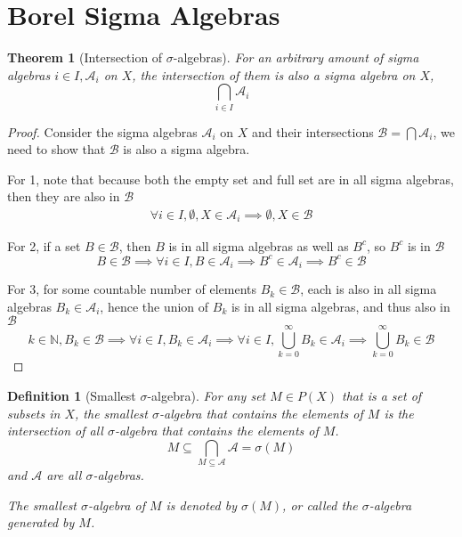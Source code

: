 \documentclass{article}
\newtheorem{theorem}{Theorem}[section]
\newtheorem{defi}{Definition}[section]
\begin{document}
\section{Borel Sigma Algebras}
\begin{theorem}[Intersection of $\sigma$-algebras]
    For an arbitrary amount of sigma algebras $i \in I, \mathcal A_i$ on $X$, the intersection of them is also a sigma algebra on $X$,
    \[
        \bigcap_{i \in I} \mathcal A_i
    \]
\end{theorem}
\begin{proof}
    Consider the sigma algebras $\mathcal A_i$ on $X$ and their intersections $\mathcal B = \bigcap \mathcal A_i$, we need to show that $\mathcal B$ is also a sigma algebra.

    For 1, note that because both the empty set and full set are in all sigma algebras, then they are also in $\mathcal B$
    \begin{align*}
        \forall i \in I, \emptyset, X \in \mathcal A_i \implies \emptyset, X \in \mathcal B
    \end{align*}

    For 2, if a set $B \in \mathcal{B}$, then $B$ is in all sigma algebras as well as $B^c$, so $B^c$ is in $\mathcal{B}$
    \[
        B \in \mathcal{B} \implies \forall i \in I, B \in \mathcal{A}_i \implies B^c \in \mathcal{A}_i \implies B^c \in \mathcal{B}
    \]

    For 3, for some countable number of elements $B_k \in \mathcal B$, each is also in all sigma algebras $B_k \in \mathcal A_i$, hence the union of $B_k$ is in all sigma algebras, and thus also in $\mathcal B$
    \[
        k \in \mathbb{N}, B_k \in \mathcal B \implies \forall i \in I, B_k \in \mathcal A_i \implies \forall i \in I, \bigcup_{k=0}^{\infty} B_k \in \mathcal A_i \implies \bigcup_{k=0}^{\infty} B_k \in \mathcal B
    \]
\end{proof}

\begin{defi}[Smallest $\sigma$-algebra]
    For any set $M \in P(X)$ that is a set of subsets in $X$, the smallest $\sigma$-algebra that contains the elements of $M$ is the intersection of all $\sigma$-algebra that contains the elements of $M$.
    \[
        M \subseteq \bigcap_{M \subseteq \mathcal A} \mathcal A = \sigma(M)
    \]
    and $\mathcal A$ are all $\sigma$-algebras.

    The smallest $\sigma$-algebra of $M$ is denoted by $\sigma(M)$, or called the $\sigma$-algebra generated by $M$.
\end{defi}
\end{document}
